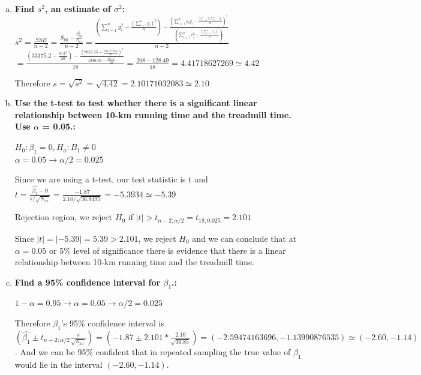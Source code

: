 \documentclass{article}
\begin{document}
\begin{enumerate}[1.]
\begin{enumerate}[(a)]
\item \textbf{Find $s^2$, an estimate of $\sigma^2$: } \\

\begingroup
\Large
$s^2 = \frac{SSE}{n-2} = \frac{S_{yy} - \frac{S_{xy}^2}{S_{xx}}}{n-2} = \frac{            (\sum_{i=1}^{n}{y_i^2} - \frac{ (\sum_{i=1}^{n}{y_i})^2}{n} )  - 
\frac{   ( \sum_{i=1}^{n}{x_iy_i }  - \frac{  \sum_{i=1}^{n}{x_i}  \sum_{i=1}^{n}{y_i}  }{n})^2     }
{    (\sum_{i=1}^{n}{x_i^2} - \frac{ (\sum_{i=1}^{n}{x_i})^2}{n} )     }}
{n - 2}$ \\
$ = \frac{ (33175.2 - \frac{812^2}{20}) - \frac{ (7852.25 - \frac{195.1 * 812}{20})^2}{1940.05-\frac{195.1^2}{20}}  }{18} = \frac{208 - 128.49}{18} = 4.41718627269 \simeq 4.42 $
\endgroup

Therefore $s = \sqrt{s^2} = \sqrt{4.42} = 2.10171032083 \simeq 2.10$

  \item \textbf{Use the t-test to test whether there is a significant linear relationship between 10-km
running time and the treadmill time. Use $\alpha$ = 0.05.: }

$H_0: \beta_1 = 0, H_a: B_1 \neq 0$ \\
$\alpha = 0.05 \to \alpha/2 = 0.025$

Since we are using a t-test, our test statistic is t and $t= \frac{\hat{\beta_1} - 0}{s/\sqrt{S_{xx}}} = \frac{-1.87}{2.10/\sqrt{36.8495}} = -5.3934 \simeq -5.39$

Rejection region, we reject $H_0$ if $|t| > t_{n-2;\alpha/2} = t_{18;0.025} = 2.101$

Since $|t| = |-5.39| = 5.39 > 2.101$, we reject $H_0$ and we can conclude that at $\alpha = 0.05$ or 5\% level of significance there is evidence that there is a linear relationship between 10-km running time and the treadmill time.

  \item \textbf{ Find a 95\% confidence interval for $\beta_1$.: }

$1 - \alpha = 0.95 \to \alpha = 0.05 \to \alpha/2 = 0.025$

Therefore $\beta_1$'s 95\% confidence interval is \\ 
$(\hat{\beta_1} \pm t_{n-2;\alpha/2}\frac{s}{\sqrt{S_{xx}}}) = (-1.87 \pm 2.101 * \frac{2.10}{\sqrt{36.85}}) = (-2.59474163696, -1.13990876535) \simeq (-2.60, -1.14) $. And we can be 95\% confident that in repeated sampling the true value of $\beta_1$ would lie in the interval $(-2.60, -1.14)$.


\end{enumerate}
\end{enumerate}
\end{document}

